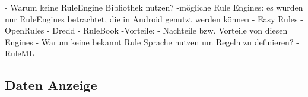 - Warum keine RuleEngine Bibliothek nutzen?
-mögliche Rule Engines: es wurden nur RuleEngines betrachtet, die in Android genutzt werden können
- Easy Rules
- OpenRules
- Dredd
- RuleBook
-Vorteile:  
- Nachteile bzw. Vorteile von diesen Engines
- Warum keine bekannt Rule Sprache nutzen um Regeln zu definieren? - RuleML

\subsection{Daten Anzeige}